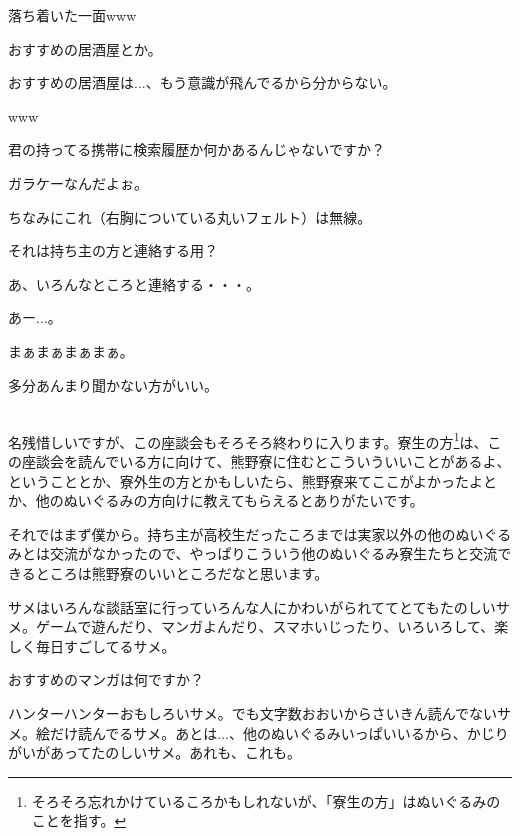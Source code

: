 \documentclass[9pt,4aj]{jsarticle}
\begin{document}
\begin{multicols}{2}
落ち着いた一面www

おすすめの居酒屋とか。

おすすめの居酒屋は...、もう意識が飛んでるから分からない。

www

君の持ってる携帯に検索履歴か何かあるんじゃないですか？

ガラケーなんだよぉ。

ちなみにこれ（右胸についている丸いフェルト）は無線。

それは持ち主の方と連絡する用？

あ、いろんなところと連絡する・・・。

あー...。

まぁまぁまぁまぁ。

多分あんまり聞かない方がいい。

\\
名残惜しいですが、この座談会もそろそろ終わりに入ります。寮生の方\footnote{そろそろ忘れかけているころかもしれないが、「寮生の方」はぬいぐるみのことを指す。}は、この座談会を読んでいる方に向けて、熊野寮に住むとこういういいことがあるよ、ということとか、寮外生の方とかもしいたら、熊野寮来てここがよかったよとか、他のぬいぐるみの方向けに教えてもらえるとありがたいです。

それではまず僕から。持ち主が高校生だったころまでは実家以外の他のぬいぐるみとは交流がなかったので、やっぱりこういう他のぬいぐるみ寮生たちと交流できるところは熊野寮のいいところだなと思います。

サメはいろんな談話室に行っていろんな人にかわいがられててとてもたのしいサメ。ゲームで遊んだり、マンガよんだり、スマホいじったり、いろいろして、楽しく毎日すごしてるサメ。

おすすめのマンガは何ですか？

ハンターハンターおもしろいサメ。でも文字数おおいからさいきん読んでないサメ。絵だけ読んでるサメ。あとは...、他のぬいぐるみいっぱいいるから、かじりがいがあってたのしいサメ。あれも、これも。


\end{multicols}
\end{document}
